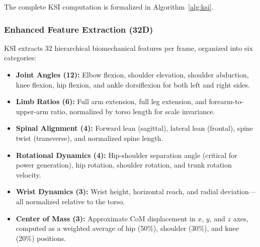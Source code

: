 \documentclass[pdflatex,sn-mathphys-num]{sn-jnl}
\theoremstyle{thmstyleone}%
\theoremstyle{thmstyletwo}%
\theoremstyle{thmstylethree}%
\begin{document}
The complete KSI computation is formalized in Algorithm~\ref{alg:ksi}.


\subsubsection{Enhanced Feature Extraction (32D)}
KSI extracts 32 hierarchical biomechanical features per frame, organized into six categories:
\begin{itemize}
    \item \textbf{Joint Angles (12):} Elbow flexion, shoulder elevation, shoulder abduction, knee flexion, hip flexion, and ankle dorsiflexion for both left and right sides.
    \item \textbf{Limb Ratios (6):} Full arm extension, full leg extension, and forearm-to-upper-arm ratio, normalized by torso length for scale invariance.
    \item \textbf{Spinal Alignment (4):} Forward lean (sagittal), lateral lean (frontal), spine twist (transverse), and normalized spine length.
    \item \textbf{Rotational Dynamics (4):} Hip-shoulder separation angle (critical for power generation), hip rotation, shoulder rotation, and trunk rotation velocity.
    \item \textbf{Wrist Dynamics (3):} Wrist height, horizontal reach, and radial deviation---all normalized relative to the torso.
    \item \textbf{Center of Mass (3):} Approximate CoM displacement in $x$, $y$, and $z$ axes, computed as a weighted average of hip (50\%), shoulder (30\%), and knee (20\%) positions.
\end{itemize}
\end{document}
